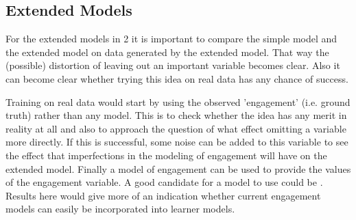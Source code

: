 \documentclass{article}
\begin{document}
\subsection{Extended Models}
For the extended models in 2 it is important to compare the simple model and the extended model on data generated by the extended model. That way the (possible) distortion of leaving out an important variable becomes clear. Also it can become clear whether trying this idea on real data has any chance of success.

Training on real data would start by using the observed 'engagement' (i.e. ground truth) rather than any model. This is to check whether the idea has any merit in reality at all and also to approach the question of what effect omitting a variable more directly. If this is successful, some noise can be added to this variable to see the effect that imperfections in the modeling of engagement will have on the extended model. Finally a model of engagement can be used to provide the values of the engagement variable. A good candidate for a model to use could be \cite{offtaskmodel}. Results here would give more of an indication whether current engagement models can easily be incorporated into learner models.
\end{document}
